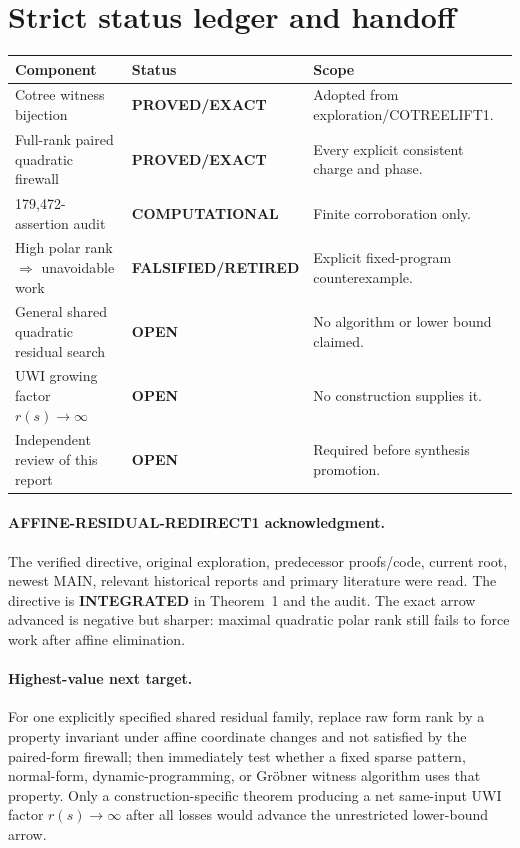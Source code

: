 \documentclass[11pt]{article}
\newcommand{\EXACT}{\textbf{PROVED/EXACT}}
\newcommand{\COMP}{\textbf{COMPUTATIONAL}}
\newcommand{\OPEN}{\textbf{OPEN}}
\newcommand{\RET}{\textbf{FALSIFIED/RETIRED}}
\begin{document}
\section{Strict status ledger and handoff}
\begin{center}\small
\begin{tabularx}{\textwidth}{@{}l l X@{}}
\toprule
Component & Status & Scope\\
\midrule
Cotree witness bijection & \EXACT & Adopted from exploration/COTREELIFT1.\\
Full-rank paired quadratic firewall & \EXACT & Every explicit consistent charge and phase.\\
179,472-assertion audit & \COMP & Finite corroboration only.\\
High polar rank $\Rightarrow$ unavoidable work & \RET & Explicit fixed-program counterexample.\\
General shared quadratic residual search & \OPEN & No algorithm or lower bound claimed.\\
UWI growing factor $r(s)\to\infty$ & \OPEN & No construction supplies it.\\
Independent review of this report & \OPEN & Required before synthesis promotion.\\
\bottomrule
\end{tabularx}
\end{center}

\paragraph{AFFINE-RESIDUAL-REDIRECT1 acknowledgment.}
The verified directive, original exploration, predecessor proofs/code, current
root, newest MAIN, relevant historical reports and primary literature were
read.  The directive is \textbf{INTEGRATED} in Theorem~1 and the audit.  The
exact arrow advanced is negative but sharper: maximal quadratic polar rank
still fails to force work after affine elimination.

\paragraph{Highest-value next target.}
For one explicitly specified shared residual family, replace raw form rank by
a property invariant under affine coordinate changes and not satisfied by
the paired-form firewall; then immediately test whether a fixed sparse
pattern, normal-form, dynamic-programming, or Gr\"obner witness algorithm
uses that property.  Only a construction-specific theorem producing a net
same-input UWI factor $r(s)\to\infty$ after all losses would advance the
unrestricted lower-bound arrow.
\end{document}
